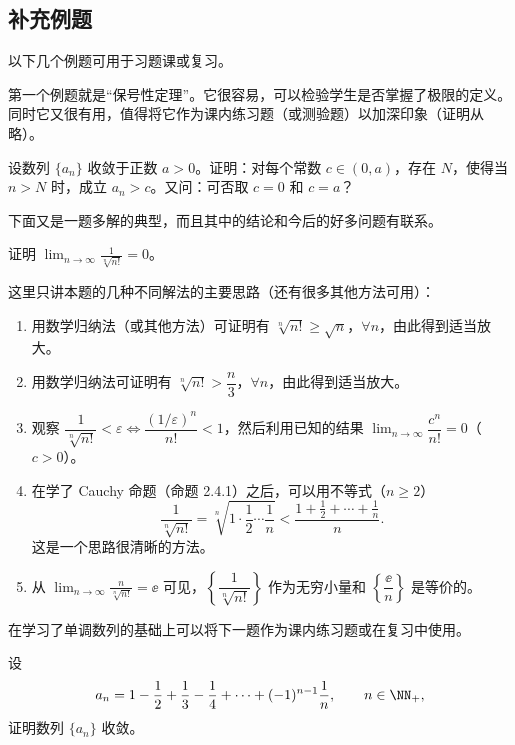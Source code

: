 \subsection{补充例题}

以下几个例题可用于习题课或复习。

第一个例题就是“保号性定理”。它很容易，可以检验学生是否掌握了极限的定义。同时它又很有用，值得将它作为课内练习题（或测验题）以加深印象（证明从略）。

\begin{xexample}[2.7.1]
设数列 $\{a_n\}$ 收敛于正数 $a>0$。证明：对每个常数 $c\in(0,a)$，存在 $N$，使得当 $n>N$ 时，成立 $a_n>c$。又问：可否取 $c=0$ 和 $c=a$？
\end{xexample}

下面又是一题多解的典型，而且其中的结论和今后的好多问题有联系。

\begin{xexample}[2.7.2]
证明 $\displaystyle\lim_{n\to\infty}\frac1{\sqrt[n]{n!}}=0$。
\end{xexample}

这里只讲本题的几种不同解法的主要思路（还有很多其他方法可用）：
\begin{enumerate}[label=\arabic*.]
  \item 用数学归纳法（或其他方法）可证明有 $\sqrt[n]{n!}\ge\sqrt n$，$\forall n$，由此得到适当放大。
  \item 用数学归纳法可证明有 $\sqrt[n]{n!}>\dfrac n3$，$\forall n$，由此得到适当放大。
  \item 观察 $\dfrac1{\sqrt[n]{n!}}<\varepsilon\Longleftrightarrow\dfrac{(1/\varepsilon)^n}{n!}<1$，然后利用已知的结果 $\displaystyle\lim_{n\to\infty}\dfrac{c^n}{n!}=0$（$c>0$）。
  \item 在学了 Cauchy 命题（命题 2.4.1）之后，可以用不等式（$n\ge2$）
  \[
    \frac1{\sqrt[n]{n!}}=\sqrt[n]{1\cdot\frac12\cdots\frac1n}
    <\frac{1+\frac12+\cdots+\frac1n}{n}.
  \]
  这是一个思路很清晰的方法。
  \item 从 $\displaystyle\lim_{n\to\infty}\frac n{\sqrt[n]{n!}}=\ee$ 可见，$\left\{\dfrac1{\sqrt[n]{n!}}\right\}$ 作为无穷小量和 $\left\{\dfrac\ee n\right\}$ 是等价的。
\end{enumerate}

在学习了单调数列的基础上可以将下一题作为课内练习题或在复习中使用。

\begin{xexample}[2.7.3]
设
\[
  a_n=1-\frac12+\frac13-\frac14+\cdots+(-1)^{n-1}\frac1n,
  \qquad n\in\NN_+,
\]
证明数列 $\{a_n\}$ 收敛。
\end{xexample}

